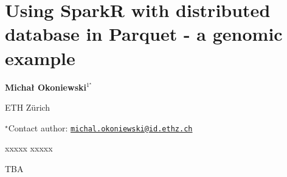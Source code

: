 \documentclass[\main/boa.tex]{subfiles}
\begin{document}
\pagestyle{empty}

\section{Using SparkR with distributed database in Parquet - a genomic example}

\begin{center}
  {\bf Michał Okoniewski$^{1^\star}$}
\end{center}

\vskip 0.3cm

\begin{affiliations}
\begin{enumerate}
\begin{minipage}{0.915\textwidth}
\centering
\item ETH Zürich \\[-2pt]
\end{minipage}
\end{enumerate}
$^\star$Contact author: \href{mailto:michal.okoniewski@id.ethz.ch}{\nolinkurl{michal.okoniewski@id.ethz.ch}}\\
\end{affiliations}

\vskip 0.5cm

\begin{minipage}{0.915\textwidth}
\keywords xxxxx
\packages xxxxx
\end{minipage}

\vskip 0.8cm

TBA
\end{document}
